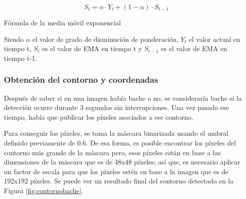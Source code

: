 \begin{myequation}[h]
	\begin{equation}
		S_t = \alpha \cdot Y_t + (1 - \alpha) \cdot S_{t-1}
		\nonumber
		\label{ec:ema}
	\end{equation}
	\caption[Fórmula de la media móvil exponencial]{Fórmula de la media móvil exponencial}
\end{myequation} 

Siendo $\alpha$  el valor de grado de disminución de ponderación, $Y_t$ el valor actual en tiempo t, $S_t$ es el valor de \acs{EMA} en tiempo t y $S_{t-1}$ es el valor de \acs{EMA} en tiempo t-1.
 
\subsubsection{Obtención del contorno y coordenadas}
\label{subsec:contornoycoordenadas}

Después de saber si en una imagen había bache o no, se consideraría bache si la detección ocurre durante 3 segundos sin interrupciones. Una vez pasado ese tiempo, había que publicar los píxeles asociados a ese contorno. 

Para conseguir los píxeles, se toma la máscara binarizada usando el umbral definido previamente de 0.6. De esa forma, es posible encontrar los píxeles del contorno más grande de la máscara pero, esos píxeles están en base a las dimensiones de la máscara que es de 48x48 píxeles; así que, es necesario aplicar un factor de escala para que los píxeles estén en base a la imagen que es de 192x192 píxeles. Se puede ver un resultado final del contorno detectado en la Figura \ref{fig:contornobache}.
  

